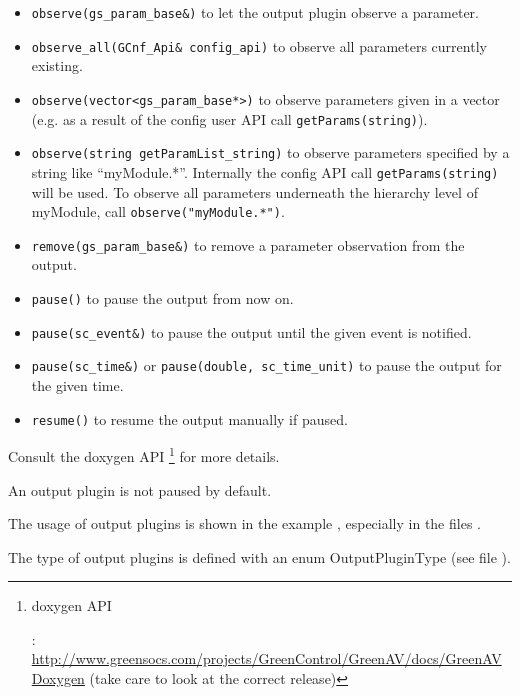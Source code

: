 \begin{itemize}
  \item \lstinline|observe(gs_param_base&)| to let the output plugin observe a parameter.
  \item \lstinline|observe_all(GCnf_Api& config_api)| to observe all parameters currently existing.
  \item \lstinline|observe(vector<gs_param_base*>)| to observe parameters given in a vector (e.g. as a result of the config user API call \lstinline|getParams(string)|).
  \item \lstinline|observe(string getParamList_string)| to observe parameters specified by a string like \mbox{``\sffamily myModule.*}''. Internally the config API call \lstinline|getParams(string)| will be used. To observe all parameters underneath the hierarchy level of {\sffamily myModule}, call \lstinline|observe("myModule.*")|.
  \item \lstinline|remove(gs_param_base&)| to remove a parameter observation from the output.
  \item \lstinline|pause()| to pause the output from now on.
  \item \lstinline|pause(sc_event&)| to pause the output until the given event is notified.
  \item \lstinline|pause(sc_time&)| or \lstinline[language=TeX]|pause(double, sc_time_unit)| to pause the output for the given time.
  \item \lstinline|resume()| to resume the output manually if paused.
\end{itemize}

Consult the doxygen API \footnote{\hypertarget{GAVDoxygenRef08target}{\GreenAV doxygen API}: \url{http://www.greensocs.com/projects/GreenControl/GreenAV/docs/GreenAVDoxygen} (take care to look at the correct release)} for more details.

An output plugin is not paused by default.

The usage of output plugins is shown in the example , especially in the files .

The type of output plugins is defined with an enum {\sffamily OutputPluginType} (see file \mbox{).}

